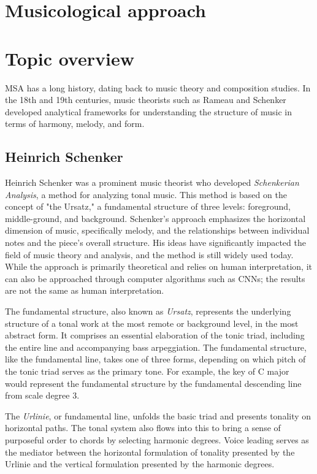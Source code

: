 \section{Musicological approach}
\section{Topic overview}

MSA has a long history, dating back to music theory and composition studies. In the 18th and 19th centuries, music theorists such as Rameau and Schenker developed analytical frameworks for understanding the structure of music in terms of harmony, melody, and form.

\subsection{Heinrich Schenker}

Heinrich Schenker was a prominent music theorist who developed \textit{Schenkerian Analysis}, a method for analyzing tonal music. This method is based on the concept of "the Ursatz," a fundamental structure of three levels: foreground, middle-ground, and background. Schenker's approach emphasizes the horizontal dimension of music, specifically melody, and the relationships between individual notes and the piece's overall structure. His ideas have significantly impacted the field of music theory and analysis, and the method is still widely used today. While the approach is primarily theoretical and relies on human interpretation, it can also be approached through computer algorithms such as CNNs; the results are not the same as human interpretation.

The fundamental structure, also known as \textit{Ursatz}, represents the underlying structure of a tonal work at the most remote or background level, in the most abstract form. It comprises an essential elaboration of the tonic triad, including the entire line and accompanying bass arpeggiation. The fundamental structure, like the fundamental line, takes one of three forms, depending on which pitch of the tonic triad serves as the primary tone. For example, the key of C major would represent the fundamental structure by the fundamental descending line from scale degree 3.

The \textit{Urlinie}, or fundamental line, unfolds the basic triad and presents tonality on horizontal paths. The tonal system also flows into this to bring a sense of purposeful order to chords by selecting harmonic degrees. Voice leading serves as the mediator between the horizontal formulation of tonality presented by the Urlinie and the vertical formulation presented by the harmonic degrees.


